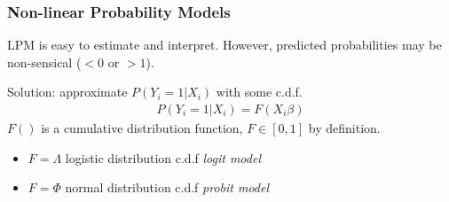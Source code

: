 \documentclass[pdftex]{beamer}
\begin{document}


\begin{frame}
\frametitle{Non-linear Probability Models}
LPM is easy to estimate and interpret. However, predicted probabilities may be non-sensical ($<0$ or $>1$).\medskip

Solution: approximate $P(Y_i=1|X_i)$ with some c.d.f.
\begin{eqnarray*}
  P(Y_i=1|X_i) = F(X_i \beta)
\end{eqnarray*}
$F()$ is a cumulative distribution function, $F\in[0,1]$ by definition.
\begin{itemize}
  \item $F=\Lambda$ logistic distribution c.d.f \emph{logit model}
  \item $F=\Phi$ normal distribution c.d.f \emph{probit model}
\end{itemize}
\end{frame}
\end{document}
